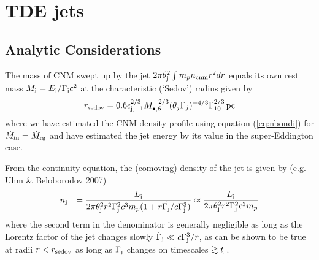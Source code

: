 \documentclass[usenatbib,fleqn]{mnras}
\newcommand       \be          {\begin{eqnarray}}
\newcommand       \ee          {\end{eqnarray}}
\newcommand{\Mbh}[1][]{M_{\bullet#1}}
\begin{document}


\section{TDE jets}
\label{sec:jet}

\subsection{Analytic Considerations}
\label{sec:analytic}


The mass of CNM swept up by the jet $2\pi\theta_{\rm j}^{2}\int m_p n_{\rm cnm}r^{2}dr$ equals its own rest mass $M_{\rm j} = E_{\rm j}/\Gamma_{\rm j}c^{2}$ at the characteristic (`Sedov') radius given by
\be
r_{\rm sedov} = 0.6\epsilon_{\rm j,-1}^{2/3}M_{\bullet,6}^{-2/3}(\theta_j \Gamma_j)^{-4/3}\Gamma_{10}^{2/3}\,{\rm pc}
\ee
where we have estimated the CNM density profile using equation (\ref{eq:nbondi}) for $\dot{M}_{\rm in} = \dot{M}_{\rm rg}$ and have estimated the jet energy by its value in the super-Eddington case.  

From the continuity equation, the (comoving) density of the jet is given by (e.g. Uhm \& Beloborodov 2007)
 \begin{eqnarray}
&n_{\rm j}& =  \frac{L_{\rm j}}{2\pi \theta_{\rm j}^{2}r^{2}\Gamma_{\rm j}^{2}c^{3}m_p(1 + r \dot{\Gamma_{\rm j}}/c\Gamma_{\rm j}^{3})} \approx  \frac{L_{\rm j}}{2\pi \theta_{\rm j}^{2}r^{2}\Gamma_{\rm j}^{2}c^{3}m_p}
\end{eqnarray}
where the second term in the denominator is generally negligible as long as the Lorentz factor of the jet changes slowly $\dot{\Gamma}_{\rm j} \ll c\Gamma_{\rm j}^{3}/r$, as can be shown to be true at radii $r < r_{\rm sedov}$ as long as $\Gamma_{\rm j}$ changes on timescales $\gtrsim t_{\rm j}$.
\end{document}
